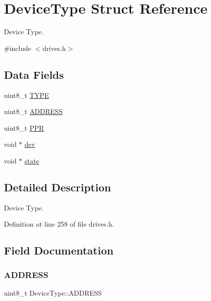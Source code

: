 \hypertarget{structDeviceType}{}\section{Device\+Type Struct Reference}
\label{structDeviceType}


Device Type.  




{\ttfamily \#include $<$drives.\+h$>$}

\subsection*{Data Fields}
\begin{DoxyCompactItemize}
\item 
uint8\+\_\+t \hyperlink{structDeviceType_acee5219162b6f47a9423b2086d127ede}{T\+Y\+PE}
\item 
uint8\+\_\+t \hyperlink{structDeviceType_a62529b7435785e39e8e7c5019303c2dd}{A\+D\+D\+R\+E\+SS}
\item 
uint8\+\_\+t \hyperlink{structDeviceType_ae0e59c6c17582ff80bdab3f2010e8d57}{P\+PR}
\item 
void $\ast$ \hyperlink{structDeviceType_a59fc3b3cb45f8ee0cd1016bd64804d3b}{dev}
\item 
void $\ast$ \hyperlink{structDeviceType_ad0fc43d63606bab6c259047e36512e08}{state}
\end{DoxyCompactItemize}


\subsection{Detailed Description}
Device Type. 

Definition at line 258 of file drives.\+h.



\subsection{Field Documentation}
\mbox{\label{structDeviceType_a62529b7435785e39e8e7c5019303c2dd}} 
\subsubsection{\texorpdfstring{A\+D\+D\+R\+E\+SS}{ADDRESS}}
{\footnotesize\ttfamily uint8\+\_\+t Device\+Type\+::\+A\+D\+D\+R\+E\+SS}



